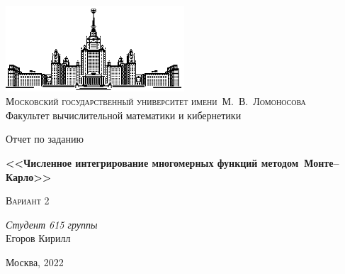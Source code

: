 \thispagestyle{empty}
\begin{center}
    \ \vspace{-3cm}

    \includegraphics[width=0.5\textwidth]{title_page/msu.eps}\\

    {\small{\scshape  Московский государственный университет имени~М.~В.~Ломоносова}\\
    Факультет вычислительной математики и кибернетики}

    \vfill

    {\Large Отчет по заданию}

    \vspace{1cm}

    {\LARGE\bfseries <<Численное интегрирование многомерных функций методом~Монте--Карло>>}

    \vspace{1.5cm}

    {\scshape Вариант 2}
\end{center}

\vspace{3cm}

\begin{flushright}
    \large
    \textit{Студент 615 группы}\\
    Егоров Кирилл 
\end{flushright}

\vfill

\begin{center}
    Москва, 2022
\end{center}

\clearpage